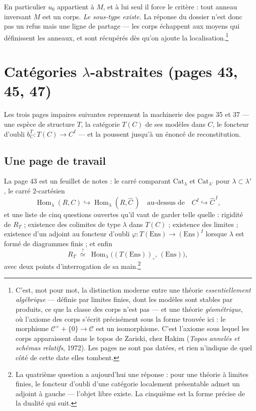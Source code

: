 \documentclass[11pt,a4paper]{article}
\begin{document}
En particulier $u_{0}$ appartient à $M$, et à lui seul il force le critère :
tout anneau inversant $M$ est un corps. \emph{Le sous-type existe.} La réponse
du dossier n'est donc pas un refus mais une ligne de partage — les corps
échappent aux moyens qui définissent les anneaux, et sont récupérés dès qu'on
ajoute la localisation.\footnote{C'est, mot pour mot, la distinction moderne
entre une théorie \emph{essentiellement algébrique} — définie par limites
finies, dont les modèles sont stables par produits, ce que la classe des corps
n'est pas — et une théorie \emph{géométrique}, où l'axiome des corps s'écrit
précisément sous la forme trouvée ici : le morphisme
$\mathcal{C}^{\times} + \{0\} \to \mathcal{C}$ est un isomorphisme. C'est
l'axiome sous lequel les corps apparaissent dans le topos de Zariski, chez
Hakim (\emph{Topos annelés et schémas relatifs}, 1972). Les pages ne sont pas
datées, et rien n'indique de quel côté de cette date elles tombent.}

\section*{Catégories $\lambda$-abstraites (pages 43, 45, 47)}

Les trois pages impaires suivantes reprennent la machinerie des pages 35 et 37 —
une espèce de structure $T$, la catégorie $T(C)$ de ses modèles dans $C$, le
foncteur d'oubli $b^{T}_{C} : T(C) \to C^{I}$ — et la poussent jusqu'à un
énoncé de reconstitution.

\subsection*{Une page de travail}

La page 43 est un feuillet de notes : le carré comparant $\mathrm{Cat}_{\lambda}$
et $\mathrm{Cat}_{\lambda'}$ pour $\lambda \subset \lambda'$, le carré
2-cartésien
\[
\operatorname{Hom}_{\lambda}(R, C) \hookrightarrow
\operatorname{Hom}_{\lambda}(R, \widehat{C}\,)
\quad\text{au-dessus de}\quad
C^{I} \hookrightarrow \widehat{C}^{\,I},
\]
et une liste de cinq questions ouvertes qu'il vaut de garder telle quelle :
rigidité de $R_{T}$ ; existence des colimites de type $\lambda$ dans $T(C)$ ;
existence des limites ; existence d'un adjoint au foncteur d'oubli
$\varphi : T(\mathrm{Ens}) \to (\mathrm{Ens})^{I}$ lorsque $\lambda$ est formé
de diagrammes finis ; et enfin
\[
R_{T} \;\overset{?}{\simeq}\; \operatorname{Hom}_{\lambda}
\bigl((T(\mathrm{Ens}))_{\circ},\, (\mathrm{Ens})\bigr),
\]
avec deux points d'interrogation de sa main.\footnote{La quatrième question a
aujourd'hui une réponse : pour une théorie à limites finies, le foncteur
d'oubli d'une catégorie localement présentable admet un adjoint à gauche —
l'objet libre existe. La cinquième est la forme précise de la dualité qui suit.}
\end{document}
